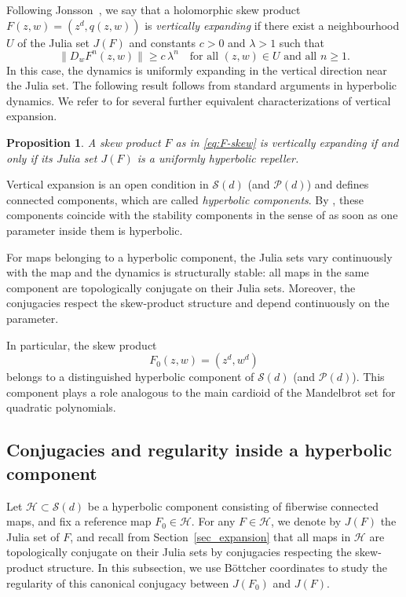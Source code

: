 \documentclass[11pt]{amsart}
\theoremstyle{plain}
\newtheorem{prop}[thm]{Proposition}
\theoremstyle{definition}
\theoremstyle{remark}
\begin{document}
Following Jonsson~\cite{Jonsson99}, we say that a holomorphic skew product
$F(z,w)=(z^d,q(z,w))$
is \emph{vertically expanding} if there exist a neighbourhood $U$ of the Julia set $J(F)$
and constants $c>0$ and $\lambda>1$ such that
\[
\|D_w F^n(z,w)\|\ge c\,\lambda^n
\quad \text{for all } (z,w)\in U \text{ and all } n\ge1.
\]
In this case, the dynamics is uniformly expanding in the vertical direction near the Julia set.
The following result follows
 from standard arguments in hyperbolic dynamics.
 We refer to \cite{Jonsson99} for several further
equivalent characterizations of vertical expansion.

\begin{prop}\label{prop_vert_exp_hyp}
A skew product $F$ as in \eqref{eq:F-skew} 
is vertically expanding if and only if its Julia set $J(F)$
is a uniformly hyperbolic repeller.
\end{prop}


Vertical expansion is an open condition in $\mathcal S(d)$
(and $\mathcal P(d)$)
 and defines
connected components, which are 
called
\emph{hyperbolic components}.
By \cite{AstorgBianchi1}, these components coincide with
the stability components in the sense of \cite{BBDstab, Bianchi19}
as soon as one parameter inside them is hyperbolic.

For maps belonging to a hyperbolic component, the Julia sets vary continuously with the
map and the dynamics is structurally stable: all maps in the same component are
topologically conjugate on their Julia sets.
Moreover, the conjugacies respect the skew-product structure and depend continuously on
the parameter.




In particular, the skew product
\[
F_0(z,w)=(z^d,w^d)
\]
belongs to a distinguished hyperbolic component of $\mathcal S(d)$
(and $\mathcal P(d)$).
This component plays a role analogous to the
main cardioid of the Mandelbrot set for quadratic polynomials.




\subsection{Conjugacies and regularity inside a hyperbolic component}\label{sec_conjugacies}
Let
 $\mathcal H \subset \mathcal S(d)$ be
  a hyperbolic component
  consisting of fiberwise connected maps,
   and fix a reference map
$F_0\in\mathcal H$.
For any $F\in\mathcal H$, we denote by $J(F)$ the Julia set of $F$, and recall from
Section~\ref{sec_expansion} 
that all maps in $\mathcal H$ are topologically conjugate on their
Julia sets by conjugacies respecting the skew-product structure.
In this subsection, we use 
B\"ottcher coordinates to 
study the regularity of this 
 canonical conjugacy between $J(F_0)$ and $J(F)$.
\end{document}

